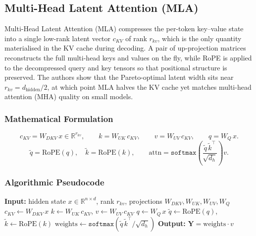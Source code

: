 \subsection{Multi-Head Latent Attention (MLA)}
Multi-Head Latent Attention (MLA) \citep{mehta_mla_2025} compresses the per-token key--value state into a single low-rank latent vector $c_{KV}$ of rank $r_{kv}$, which is the only quantity materialised in the KV cache during decoding. A pair of up-projection matrices reconstructs the full multi-head keys and values on the fly, while RoPE is applied to the decompressed query and key tensors so that positional structure is preserved. The authors show that the Pareto-optimal latent width sits near $r_{kv} = d_{\text{hidden}} / 2$, at which point MLA halves the KV cache yet matches multi-head attention (MHA) quality on small models.

\subsubsection{Mathematical Formulation}
\[
c_{KV} = W_{DKV}\, x \in \mathbb{R}^{r_{kv}}, \qquad
k = W_{UK}\, c_{KV}, \qquad
v = W_{UV}\, c_{KV}, \qquad
q = W_{Q}\, x.
\]
\[
\tilde q = \text{RoPE}(q), \quad \tilde k = \text{RoPE}(k), \qquad
\text{attn} = \texttt{softmax}\!\left(\frac{\tilde q\, \tilde k^\top}{\sqrt{d_h}}\right) v.
\]

\subsubsection{Algorithmic Pseudocode}
\begin{algorithmic}[1]
\State \textbf{Input:} hidden state $x \in \mathbb{R}^{n \times d}$, rank $r_{kv}$, projections $W_{DKV}, W_{UK}, W_{UV}, W_{Q}$
\State $c_{KV} \gets W_{DKV}\, x$ 
\State $k \gets W_{UK}\, c_{KV}$, \quad $v \gets W_{UV}\, c_{KV}$ 
\State $q \gets W_{Q}\, x$
\State $\tilde q \gets \text{RoPE}(q)$, \quad $\tilde k \gets \text{RoPE}(k)$ 
\State $\text{weights} \gets \texttt{softmax}(\tilde q\, \tilde k^\top / \sqrt{d_h})$
\State \textbf{Output:} $\mathbf{Y} = \text{weights} \cdot v$
\end{algorithmic}

